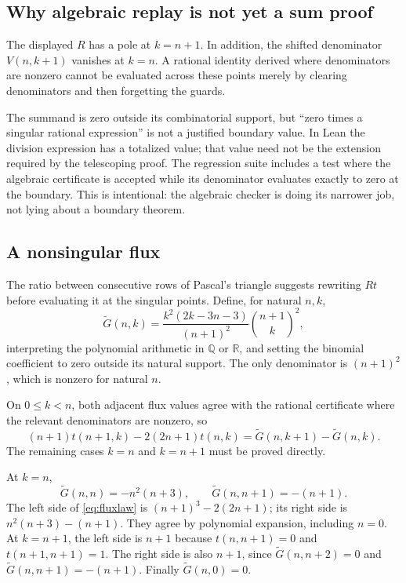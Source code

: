 \documentclass[11pt,letterpaper]{article}
\newcommand{\Q}{\mathbb Q}\newcommand{\R}{\mathbb R}\newcommand{\N}{\mathbb N}
\theoremstyle{definition}\newtheorem{definition}[theorem]{Definition}
\theoremstyle{remark}\newtheorem{remark}[theorem]{Remark}
\begin{document}
\subsection{Why algebraic replay is not yet a sum proof}
The displayed $R$ has a pole at $k=n+1$. In addition, the shifted denominator
$V(n,k+1)$ vanishes at $k=n$. A rational identity derived where denominators are
nonzero cannot be evaluated across these points merely by clearing denominators
and then forgetting the guards.

The summand is zero outside its combinatorial support, but ``zero times a
singular rational expression'' is not a justified boundary value. In Lean the
division expression has a totalized value; that value need not be the extension
required by the telescoping proof. The regression suite includes a test where
the algebraic certificate is accepted while its denominator evaluates exactly
to zero at the boundary. This is intentional: the algebraic checker is doing
its narrower job, not lying about a boundary theorem.

\subsection{A nonsingular flux}
The ratio between consecutive rows of Pascal's triangle suggests rewriting
$R t$ before evaluating it at the singular points. Define, for natural $n,k$,
\begin{equation}
 \widetilde G(n,k)=
 \frac{k^2(2k-3n-3)}{(n+1)^2}\binom{n+1}{k}^2,
 \label{eq:nonsingularflux}
\end{equation}
interpreting the polynomial arithmetic in $\Q$ or $\R$, and setting the
binomial coefficient to zero outside its natural support. The only denominator
is $(n+1)^2$, which is nonzero for natural $n$.

On $0\le k<n$, both adjacent flux values agree with the rational certificate
where the relevant denominators are nonzero, so
\begin{equation}
 (n+1)t(n+1,k)-2(2n+1)t(n,k)
 =\widetilde G(n,k+1)-\widetilde G(n,k).
 \label{eq:fluxlaw}
\end{equation}
The remaining cases $k=n$ and $k=n+1$ must be proved directly.

At $k=n$,
\[
 \widetilde G(n,n)=-n^2(n+3),\qquad
 \widetilde G(n,n+1)=-(n+1).
\]
The left side of \eqref{eq:fluxlaw} is
$(n+1)^3-2(2n+1)$; its right side is $n^2(n+3)-(n+1)$. They agree by polynomial
expansion, including $n=0$.
At $k=n+1$, the left side is $n+1$ because $t(n,n+1)=0$ and
$t(n+1,n+1)=1$. The right side is also $n+1$, since
$\widetilde G(n,n+2)=0$ and $\widetilde G(n,n+1)=-(n+1)$.
Finally $\widetilde G(n,0)=0$.
\end{document}
